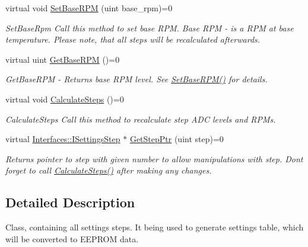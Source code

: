 \begin{DoxyCompactItemize}
virtual void \hyperlink{class_interfaces_1_1_i_settings_generator_a4caf07447d0930440d9f21318892244c}{Set\+Base\+R\+PM} (uint base\+\_\+rpm)=0
\begin{DoxyCompactList}\small\item\em Set\+Base\+Rpm Call this method to set base R\+PM. Base R\+PM -\/ is a R\+PM at base temperature. Please note, that all steps will be recalculated afterwards. \end{DoxyCompactList}\item 
virtual uint \hyperlink{class_interfaces_1_1_i_settings_generator_ad088253da57b2ee0b94fe6fd1fb2dfdd}{Get\+Base\+R\+PM} ()=0
\begin{DoxyCompactList}\small\item\em Get\+Base\+R\+PM -\/ Returns base R\+PM level. See \hyperlink{class_interfaces_1_1_i_settings_generator_a4caf07447d0930440d9f21318892244c}{Set\+Base\+R\+P\+M()} for details. \end{DoxyCompactList}\item 
\mbox{\label{class_interfaces_1_1_i_settings_generator_a7788522bb5d25bfd8b8af430512ec5f5}} 
virtual void \hyperlink{class_interfaces_1_1_i_settings_generator_a7788522bb5d25bfd8b8af430512ec5f5}{Calculate\+Steps} ()=0
\begin{DoxyCompactList}\small\item\em Calculate\+Steps Call this method to recalculate step A\+DC levels and R\+P\+Ms. \end{DoxyCompactList}\item 
virtual \hyperlink{class_interfaces_1_1_i_settings_step}{Interfaces\+::\+I\+Settings\+Step} $\ast$ \hyperlink{class_interfaces_1_1_i_settings_generator_af1b65a18c3ade3235715ae2e9cdbcfe0}{Get\+Step\+Ptr} (uint step)=0
\begin{DoxyCompactList}\small\item\em Returns pointer to step with given number to allow manipulations with step. Don\textquotesingle{}t forget to call \hyperlink{class_interfaces_1_1_i_settings_generator_a7788522bb5d25bfd8b8af430512ec5f5}{Calculate\+Steps()} after making any changes. \end{DoxyCompactList}\end{DoxyCompactItemize}


\subsection{Detailed Description}
Class, containing all settings steps. It being used to generate settings table, which will be converted to E\+E\+P\+R\+OM data. 

